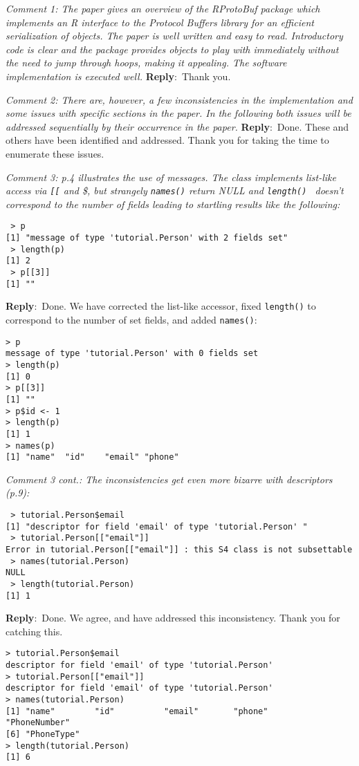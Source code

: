 \documentclass[10pt]{article}
\newcommand{\pointRaised}[2]{\smallskip %
  \textsl{{\fontseries{b}\selectfont #1}: #2}\newline}
\newcommand{\reply}[1]{\textbf{Reply}:\ #1 \smallskip } %
\begin{document}
\pointRaised{Comment 1}{The paper gives an overview of the RProtoBuf package which implements an 
  R interface to the Protocol Buffers library for an efficient 
  serialization of objects. The paper is well written and easy to read. 
  Introductory code is clear and the package provides objects to play with 
  immediately without the need to jump through hoops, making it appealing. 
  The software implementation is executed well.}
\reply{Thank you.}

\pointRaised{Comment 2}{There are, however, a few inconsistencies in the implementation and some 
  issues with specific sections in the paper. In the following both issues 
  will be addressed sequentially by their occurrence in the paper.}
\reply{Done. These and others have been identified and addressed.  Thank you
  for taking the time to enumerate these issues.}

\pointRaised{Comment 3}{p.4 illustrates the use of messages. The class implements list-like 
  access via \texttt{[[} and \$, but strangely \texttt{names()} return NULL and \texttt{length() }
  doesn't correspond to the number of fields leading to startling results like
the following:}

\begin{verbatim}
 > p
[1] "message of type 'tutorial.Person' with 2 fields set"
 > length(p)
[1] 2
 > p[[3]]
[1] ""
\end{verbatim}
\reply{Done. We have corrected the list-like accessor, fixed \texttt{length()} to
  correspond to the number of set fields, and added \texttt{names()}:}
\begin{verbatim}
> p
message of type 'tutorial.Person' with 0 fields set
> length(p)
[1] 0
> p[[3]]
[1] ""
> p$id <- 1
> length(p)
[1] 1
> names(p)
[1] "name"  "id"    "email" "phone"
\end{verbatim}

\pointRaised{Comment 3 cont.}{The inconsistencies get even more bizarre with descriptors (p.9):}

\begin{verbatim}
 > tutorial.Person$email
[1] "descriptor for field 'email' of type 'tutorial.Person' "
 > tutorial.Person[["email"]]
Error in tutorial.Person[["email"]] : this S4 class is not subsettable
 > names(tutorial.Person)
NULL
 > length(tutorial.Person)
[1] 1
\end{verbatim}
\reply{Done. We agree, and have addressed this inconsistency.  Thank you for
  catching this.}
\begin{verbatim}
> tutorial.Person$email
descriptor for field 'email' of type 'tutorial.Person' 
> tutorial.Person[["email"]]
descriptor for field 'email' of type 'tutorial.Person' 
> names(tutorial.Person)
[1] "name"        "id"          "email"       "phone"       "PhoneNumber"
[6] "PhoneType"  
> length(tutorial.Person)
[1] 6
\end{verbatim}
\end{document}
